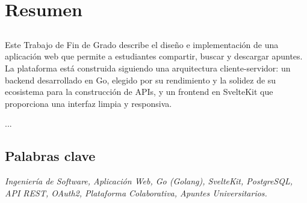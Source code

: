 \chapter*{Resumen}

\section*{\tituloPortadaVal}

Este Trabajo de Fin de Grado describe el diseño e implementación de una aplicación web que permite a estudiantes compartir, buscar y descargar apuntes. La plataforma está construida siguiendo una arquitectura cliente-servidor: un backend desarrollado en Go, elegido por su rendimiento y la solidez de su ecosistema para la construcción de APIs, y un frontend en SvelteKit que proporciona una interfaz limpia y responsiva.

...

\section*{Palabras clave}
   
\noindent\textit{Ingeniería de Software, Aplicación Web, Go (Golang), SvelteKit, 
PostgreSQL, API REST, OAuth2, Plataforma Colaborativa, 
Apuntes Universitarios.}

   


